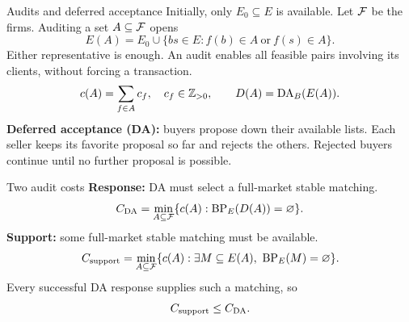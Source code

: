 \begin{frame}[t,label=audit]{Audits and deferred acceptance}
\small
Initially, only $E_0\subseteq E$ is available. Let $\mathcal F$ be the firms.
Auditing a set $A\subseteq\mathcal F$ opens
\[
 E(A)=E_0\cup\{bs\in E:f(b)\in A\ \text{or}\ f(s)\in A\}.
\]
Either representative is enough. An audit enables all feasible pairs
involving its clients, without forcing a transaction.
\[
 c(A)=\sum_{f\in A}c_f,\quad c_f\in\mathbb Z_{>0},
 \qquad D(A)=\operatorname{DA}_{B}(E(A)).
\]
\textbf{Deferred acceptance (DA):} buyers propose down their available lists.
Each seller keeps its favorite proposal so far and rejects the others.
Rejected buyers continue until no further proposal is possible.
\end{frame}

\begin{frame}[t,label=objectives]{Two audit costs}
\small
\textbf{Response:} DA must select a full-market stable matching.
\[
 C_{\mathrm{DA}}=\min_{A\subseteq\mathcal F}\{c(A):\operatorname{BP}_E(D(A))=\varnothing\}.
\]
\textbf{Support:} some full-market stable matching must be available.
\[
 C_{\mathrm{support}}=\min_{A\subseteq\mathcal F}
 \{c(A):\exists M\subseteq E(A),\ \operatorname{BP}_E(M)=\varnothing\}.
\]
Every successful DA response supplies such a matching, so
\[
 C_{\mathrm{support}}\leq C_{\mathrm{DA}}.
\]
\end{frame}
